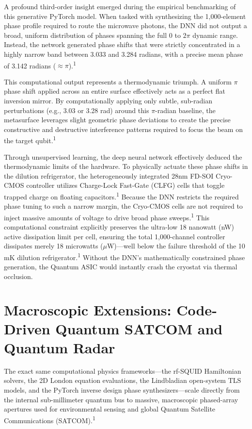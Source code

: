 \documentclass[11pt, a4paper]{article}
\begin{document}
A profound third-order insight emerged during the empirical benchmarking of this generative PyTorch model. When tasked with synthesizing the 1,000-element phase profile required to route the microwave photons, the DNN did not output a broad, uniform distribution of phases spanning the full $0$ to $2\pi$ dynamic range. Instead, the network generated phase shifts that were strictly concentrated in a highly narrow band between 3.033 and 3.284 radians, with a precise mean phase of 3.142 radians ($\approx \pi$).\textsuperscript{1}

This computational output represents a thermodynamic triumph. A uniform $\pi$ phase shift applied across an entire surface effectively acts as a perfect flat inversion mirror. By computationally applying only subtle, sub-radian perturbations (e.g., 3.03 or 3.28 rad) around this $\pi$-radian baseline, the metasurface leverages slight geometric phase deviations to create the precise constructive and destructive interference patterns required to focus the beam on the target qubit.\textsuperscript{1}

Through unsupervised learning, the deep neural network effectively deduced the thermodynamic limits of the hardware. To physically actuate these phase shifts in the dilution refrigerator, the heterogeneously integrated 28nm FD-SOI Cryo-CMOS controller utilizes Charge-Lock Fast-Gate (CLFG) cells that toggle trapped charge on floating capacitors.\textsuperscript{1} Because the DNN restricts the required phase tuning to such a narrow margin, the Cryo-CMOS cells are not required to inject massive amounts of voltage to drive broad phase sweeps.\textsuperscript{1} This computational constraint explicitly preserves the ultra-low 18 nanowatt (nW) active dissipation limit per cell, ensuring the total 1,000-channel controller dissipates merely 18 microwatts ($\mu$W)---well below the failure threshold of the 10 mK dilution refrigerator.\textsuperscript{1} Without the DNN's mathematically constrained phase generation, the Quantum ASIC would instantly crash the cryostat via thermal occlusion.

\section{Macroscopic Extensions: Code-Driven Quantum SATCOM and Quantum Radar}

The exact same computational physics frameworks---the rf-SQUID Hamiltonian solvers, the 2D London equation evaluations, the Lindbladian open-system TLS models, and the PyTorch inverse design phase synthesizers---scale directly from the internal sub-millimeter quantum bus to massive, macroscopic phased-array apertures used for environmental sensing and global Quantum Satellite Communications (SATCOM).\textsuperscript{1}
\end{document}
